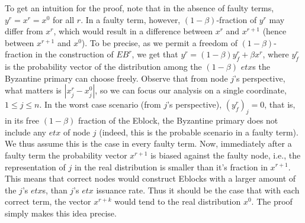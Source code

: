 To get an intuition for the proof, note that in the absence of faulty terms, $y^r=x^r=x^0$ for all $r$. In a faulty term, however, $(1-\beta)$-fraction of $y^r$ may differ from $x^r$, which would result in a difference between $x^r$ and $x^{r+1}$ (hence between $x^{r+1}$ and $x^0$). To be precise, as we permit a freedom of $(1-\beta)$-fraction in the construction of $EB^r$, we get that $y^r=(1-\beta)y^r_f+\beta x^r$, where $y^r_f$ is the probability vector of the distribution among the $(1-\beta)$ $etx$s the Byzantine primary can choose freely. Observe that from node $j$'s perspective, what matters is $|x_j^r-x_j^0|$, so we can focus our analysis on a single coordinate, $1\leq j\leq n$. In the worst case scenario (from $j$'s perspective), $(y_f^r)_j=0$, that is, in its free $(1-\beta)$ fraction of the Eblock, the Byzantine primary does not include any $etx$ of node $j$ (indeed, this is the probable scenario in a faulty term). We thus assume this is the case in every faulty term. Now, immediately after a faulty term the probability vector $x^{r+1}$ is biased against the faulty node, i.e., the representation of $j$ in the real distribution is smaller than it's fraction in $x^{r+1}$. This means that correct nodes would construct Eblocks with a larger amount of the $j$'s $etx$s, than $j$'s $etx$ issuance rate. Thus it should be the case that with each correct term, the vector $x^{r+k}$ would tend to the real distribution $x^0$. The proof simply makes this idea precise. 

